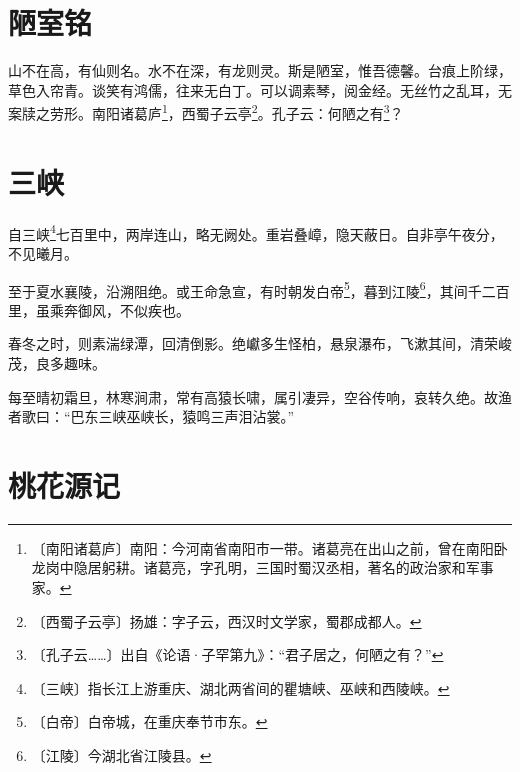 \documentclass[12pt,UTF-8,openany]{ctexbook}
\begin{document}
\chapter{陋室铭}

\begin{normalsize}
    
    山不在高，有仙则名。水不在深，有龙则灵。斯是陋室，惟吾德馨。台痕上阶绿，草色入帘青。谈笑有鸿儒，往来无白丁。可以调素琴，阅金经。无丝竹之乱耳，无案牍之劳形。南阳诸葛庐\footnote{〔南阳诸葛庐〕南阳：今河南省南阳市一带。诸葛亮在出山之前，曾在南阳卧龙岗中隐居躬耕。诸葛亮，字孔明，三国时蜀汉丞相，著名的政治家和军事家。}，西蜀子云亭\footnote{〔西蜀子云亭〕扬雄：字子云，西汉时文学家，蜀郡成都人。}。孔子云：何陋之有\footnote{〔孔子云……〕出自《论语·子罕第九》：“君子居之，何陋之有？”}？
\end{normalsize}



\chapter{三峡}

\begin{normalsize}
    
    自三峡\footnote{〔三峡〕指长江上游重庆、湖北两省间的瞿塘峡、巫峡和西陵峡。}七百里中，两岸连山，略无阙处。重岩叠嶂，隐天蔽日。自非亭午夜分，不见曦月。
    
    至于夏水襄陵，沿溯阻绝。或王命急宣，有时朝发白帝\footnote{〔白帝〕白帝城，在重庆奉节市东。}，暮到江陵\footnote{〔江陵〕今湖北省江陵县。}，其间千二百里，虽乘奔御风，不似疾也。
    
    春冬之时，则素湍绿潭，回清倒影。绝巘多生怪柏，悬泉瀑布，飞漱其间，清荣峻茂，良多趣味。
    
    每至晴初霜旦，林寒涧肃，常有高猿长啸，属引凄异，空谷传响，哀转久绝。故渔者歌曰：“巴东三峡巫峡长，猿鸣三声泪沾裳。”
\end{normalsize}



\chapter{桃花源记}
\end{document}
